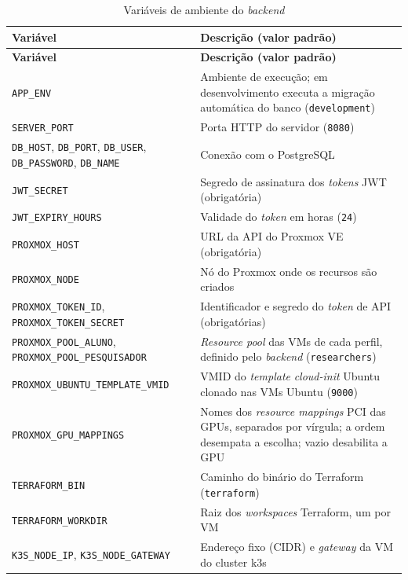 \begin{longtable}{|p{6.2cm}|p{8.4cm}|}
    \caption{Variáveis de ambiente do \textit{backend}}
    \label{tab:variaveis_ambiente} \\
    \hline
    \textbf{Variável} & \textbf{Descrição (valor padrão)} \\ \hline
    \endfirsthead
    \hline
    \textbf{Variável} & \textbf{Descrição (valor padrão)} \\ \hline
    \endhead
    \texttt{APP\_ENV} & Ambiente de execução; em desenvolvimento executa a migração automática do banco (\texttt{development}) \\ \hline
    \texttt{SERVER\_PORT} & Porta HTTP do servidor (\texttt{8080}) \\ \hline
    \texttt{DB\_HOST}, \texttt{DB\_PORT}, \texttt{DB\_USER}, \texttt{DB\_PASSWORD}, \texttt{DB\_NAME} & Conexão com o PostgreSQL \\ \hline
    \texttt{JWT\_SECRET} & Segredo de assinatura dos \textit{tokens} JWT (obrigatória) \\ \hline
    \texttt{JWT\_EXPIRY\_HOURS} & Validade do \textit{token} em horas (\texttt{24}) \\ \hline
    \texttt{PROXMOX\_HOST} & URL da API do Proxmox VE (obrigatória) \\ \hline
    \texttt{PROXMOX\_NODE} & Nó do Proxmox onde os recursos são criados \\ \hline
    \texttt{PROXMOX\_TOKEN\_ID}, \texttt{PROXMOX\_TOKEN\_SECRET} & Identificador e segredo do \textit{token} de API (obrigatórias) \\ \hline
    \texttt{PROXMOX\_POOL\_ALUNO}, \texttt{PROXMOX\_POOL\_PESQUISADOR} & \textit{Resource pool} das VMs de cada perfil, definido pelo \textit{backend} (\texttt{researchers}) \\ \hline
    \texttt{PROXMOX\_UBUNTU\_TEMPLATE\_VMID} & VMID do \textit{template} \textit{cloud-init} Ubuntu clonado nas VMs Ubuntu (\texttt{9000}) \\ \hline
    \texttt{PROXMOX\_GPU\_MAPPINGS} & Nomes dos \textit{resource mappings} PCI das GPUs, separados por vírgula; a ordem desempata a escolha; vazio desabilita a GPU \\ \hline
    \texttt{TERRAFORM\_BIN} & Caminho do binário do Terraform (\texttt{terraform}) \\ \hline
    \texttt{TERRAFORM\_WORKDIR} & Raiz dos \textit{workspaces} Terraform, um por VM \\ \hline
    \texttt{K3S\_NODE\_IP}, \texttt{K3S\_NODE\_GATEWAY} & Endereço fixo (CIDR) e \textit{gateway} da VM do cluster k3s \\ \hline

\end{longtable}
